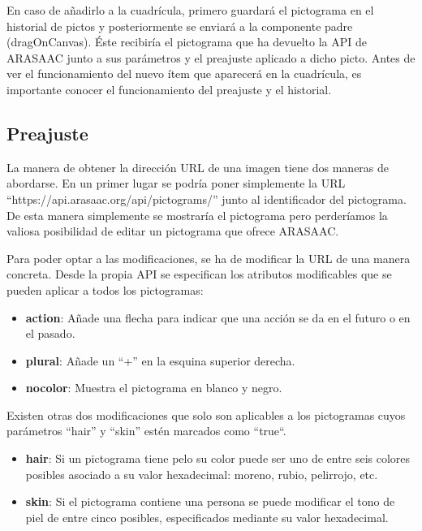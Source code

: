 En caso de añadirlo a la cuadrícula, primero guardará el pictograma en el historial de pictos y posteriormente se enviará a la componente padre (dragOnCanvas).  Éste recibiría el pictograma que ha devuelto la API de ARASAAC junto a sus parámetros y el preajuste aplicado a dicho picto. Antes de ver el funcionamiento del nuevo ítem que aparecerá en la cuadrícula, es importante conocer el funcionamiento del preajuste y el historial.


\subsection{Preajuste}
\label{preajuste}

La manera de obtener la dirección URL de una imagen tiene dos maneras de abordarse. En un primer lugar se podría poner simplemente la URL “https://api.arasaac.org/api/pictograms/” junto al identificador del pictograma. De esta manera simplemente se mostraría el pictograma pero perderíamos la valiosa posibilidad de editar un pictograma que ofrece ARASAAC.

Para poder optar a las modificaciones, se ha de modificar la URL de una manera concreta. Desde la propia API se especifican los atributos modificables que se pueden aplicar a todos los pictogramas:  


\begin{itemize}
	\item \textbf{action}: Añade una flecha para indicar que una acción se da en el futuro o en el pasado.
	\item \textbf{plural}: Añade un “+” en la esquina superior derecha.
	\item \textbf{nocolor}: Muestra el pictograma en blanco y negro.
	
\end{itemize}

Existen otras dos modificaciones que solo son aplicables a los pictogramas cuyos parámetros “hair” y “skin” estén marcados como “true“.


\begin{itemize}
	\item \textbf{hair}: Si un pictograma tiene pelo su color puede ser uno de entre seis colores posibles asociado a su valor hexadecimal: moreno, rubio, pelirrojo, etc.
	
	\item \textbf{skin}: Si el pictograma contiene una persona se puede modificar el tono de piel de entre cinco posibles, especificados mediante su valor hexadecimal.
	
\end{itemize}

